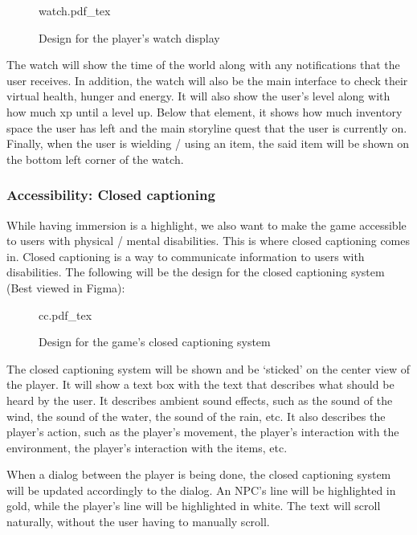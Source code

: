 \documentclass[
  11pt, %
]{assignment}
\begin{document}
\begin{figure}[!ht]
  \centering
  \def\svgwidth{0.37\linewidth}
  {watch.pdf_tex}
  \caption{Design for the player's watch display}
\end{figure}

The watch will show the time of the world along with any notifications that the user receives. In addition, the watch will also be the main interface to check their virtual health, hunger and energy. It will also show the user's level along with how much xp until a level up. Below that element, it shows how much inventory space the user has left and the main storyline quest that the user is currently on. Finally, when the user is wielding / using an item, the said item will be shown on the bottom left corner of the watch.

\subsubsection*{Accessibility: Closed captioning}

While having immersion is a highlight, we also want to make the game accessible to users with physical / mental disabilities. This is where closed captioning comes in. Closed captioning is a way to communicate information to users with disabilities. The following will be the design for the closed captioning system (Best viewed in Figma):

\begin{figure}[!ht]
  \centering
  \def\svgwidth{0.8\linewidth}
  {cc.pdf_tex}
  \caption{Design for the game's closed captioning system}
\end{figure}

The closed captioning system will be shown and be `sticked' on the center view of the player. It will show a text box with the text that describes what should be heard by the user. It describes ambient sound effects, such as the sound of the wind, the sound of the water, the sound of the rain, etc. It also describes the player's action, such as the player's movement, the player's interaction with the environment, the player's interaction with the items, etc.

When a dialog between the player is being done, the closed captioning system will be updated accordingly to the dialog. An NPC's line will be highlighted in gold, while the player's line will be highlighted in white. The text will scroll naturally, without the user having to manually scroll.
\end{document}
